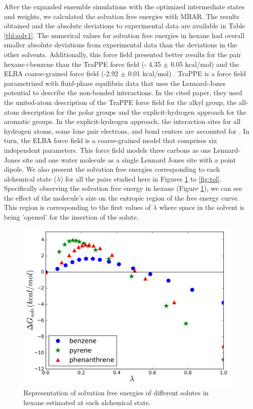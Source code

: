 \documentclass[final,12p,times,twocolumn]{elsarticle}
\begin{document}
	After the expanded ensemble simulations with the optimized intermediate states and weights, we calculated the solvation free energies with MBAR. The results obtained and the absolute deviations to experimental data \cite{doi:10.1021/ci034120c} are available  in Table \ref{tbl:solv1}. The numerical values for solvation free energies in hexane had overall smaller absolute deviations from experimental data than the deviations in the other solvents. Additionally, this force field presented better results for the pair hexane+benzene than the TraPPE force field (- 4.35  $\pm$ 0.05 kcal/mol) \cite{garrido2011} and the ELBA coarse-grained force field  (-2.92 $\pm$ 0.01 kcal/mol) \cite{doi:10.1021/acs.jctc.5b00963}. TraPPE is a force field parametrized with fluid-phase equilibria data that uses the Lennard-Jones potential to describe the non-bonded interactions. In the cited paper, they used the united-atom description of the TraPPE force field for the alkyl group, the all-atom description for the polar groups and the explicit-hydrogen approach for the aromatic groups. In the explicit-hydrogen approach, the interaction sites for all hydrogen atoms, some lone pair electrons, and bond centers are accounted for \cite{doi:10.1021/jp073586l}. In turn, the ELBA force field is a coarse-grained model that comprises six independent parameters. This force field models three carbons as one Lennard-Jones site and one water molecule as a single Lennard Jones site with a point dipole. We also present the solvation free energies corresponding to each alchemical state ($\lambda$) for all the pairs studied here in Figures \ref{fig:hex} to \ref{fig:tol}. Specifically observing the solvation free energy in hexane (Figure \ref{fig:hex}), we can see the effect of the molecule's size on the entropic region of the free energy curve. This region is corresponding to the first values of $\lambda$ where space in the solvent is being 'opened' for the insertion of the solute.
	
	\begin{figure}[h]
		\centering
		\includegraphics[width=1.0\linewidth]{Figures/hexart}
		\caption{Representation of solvation free energies of different solutes in hexane estimated at each alchemical state.}
		\label{fig:hex}
	\end{figure}
	
\end{document}
